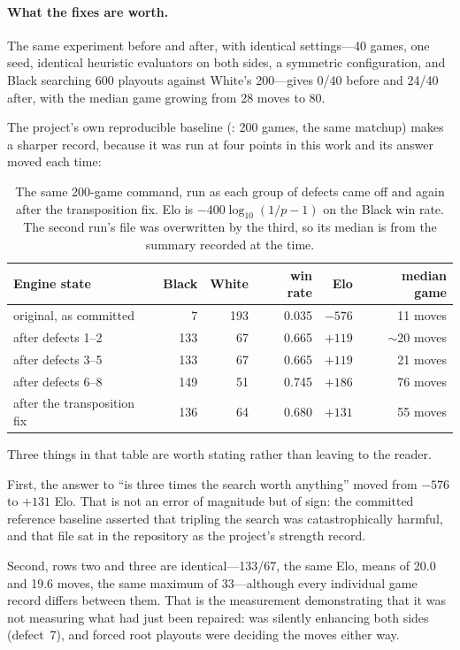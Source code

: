 \paragraph{What the fixes are worth.}
The same experiment before and after, with identical settings---40 games, one
seed, identical heuristic evaluators on both sides, a symmetric configuration,
and Black searching 600 playouts against White's 200---gives 0/40 before and
24/40 after, with the median game growing from 28 moves to 80.

The project's own reproducible baseline (: 200
games, the same matchup) makes a sharper record, because it was run at four
points in this work and its answer moved each time:

\begin{table}[htbp]
\centering\small
\begin{tabular}{@{}lrrrrr@{}}
\toprule
Engine state & Black & White & win rate & Elo & median game \\
\midrule
original, as committed              & 7   & 193 & 0.035 & $-576$ & 11 moves \\
after defects 1--2                  & 133 & 67  & 0.665 & $+119$ & ${\sim}20$ moves \\
after defects 3--5                  & 133 & 67  & 0.665 & $+119$ & 21 moves \\
after defects 6--8                  & 149 & 51  & 0.745 & $+186$ & 76 moves \\
after the transposition fix         & 136 & 64  & 0.680 & $+131$ & 55 moves \\
\bottomrule
\end{tabular}
\caption{The same 200-game command, run as each group of defects came off and
again after the transposition fix. Elo is
$-400\log_{10}(1/p-1)$ on the Black win rate. The second run's file was
overwritten by the third, so its median is from the summary recorded at the time.}
\label{tab:baseline-progression}
\end{table}

Three things in that table are worth stating rather than leaving to the reader.

First, the answer to ``is three times the search worth anything'' moved from
$-576$ to $+131$ Elo. That is not an error of magnitude but of sign: the
committed reference baseline asserted that tripling the search was
catastrophically harmful, and that file sat in the repository as the project's
strength record.

Second, rows two and three are identical---133/67, the same Elo, means of 20.0
and 19.6 moves, the same maximum of 33---although every individual game record
differs between them. That is the measurement demonstrating that it was not
measuring what had just been repaired:  was silently
enhancing both sides (defect~7), and forced root playouts were deciding the
moves either way.

